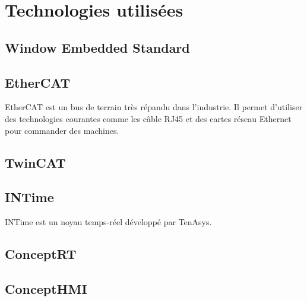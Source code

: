 \section{Technologies utilisées}

\subsection{Window Embedded Standard}

\subsection{EtherCAT}

EtherCAT est un bus de terrain très répandu dans l'industrie. Il permet d'utiliser des technologies courantes comme les câble RJ45 et des cartes réseau Ethernet pour commander des machines.

\subsection{TwinCAT}



\subsection{INTime}

INTime est un noyau temps-réel développé par TenAsys. 

\subsection{ConceptRT}

\subsection{ConceptHMI}